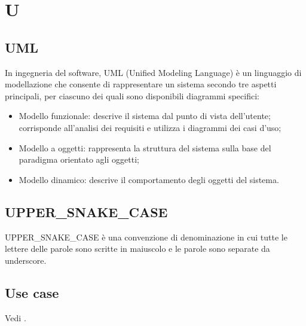\section{U}

\vspace{2em}
\subsection*{UML}
\par In ingegneria del software, UML (Unified Modeling Language) è un linguaggio di modellazione che consente di rappresentare un sistema secondo tre aspetti principali, per ciascuno dei quali sono disponibili diagrammi specifici:
\begin{itemize}
  \item Modello funzionale: descrive il sistema dal punto di vista dell'utente; corrisponde all'analisi dei requisiti e utilizza i diagrammi dei casi d'uso;
  \item Modello a oggetti: rappresenta la struttura del sistema sulla base del paradigma orientato agli oggetti;
  \item Modello dinamico: descrive il comportamento degli oggetti del sistema.
\end{itemize}

\vspace{2em}
\subsection*{UPPER\_SNAKE\_CASE}
\par UPPER\_SNAKE\_CASE è una convenzione di denominazione in cui tutte le lettere delle parole sono scritte in maiuscolo e le parole sono separate da underscore.

\vspace{2em}
\subsection*{Use case}
\par Vedi .
